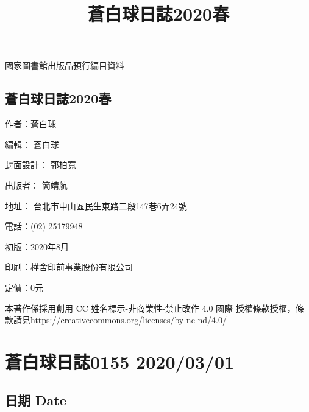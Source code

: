 \documentclass[a5paper, 12pt
]{book}
\title{蒼白球日誌2020春}
\date{}
\begin{document}
\clearpage\maketitle
\thispagestyle{empty}
\subsection{}
\begin{flushleft}
國家圖書館出版品預行編目資料 \linebreak
\end{flushleft}
\subsection{蒼白球日誌2020春}
\begin{flushleft}
作者：蒼白球

編輯： 蒼白球

封面設計： 郭柏寬

出版者： 簡靖航

地址： 台北市中山區民生東路二段147巷6弄24號

電話：(02) 25179948

初版：2020年8月

印刷：樺舍印前事業股份有限公司

定價：0元

本著作係採用創用 CC 姓名標示-非商業性-禁止改作 4.0 國際 授權條款授權，條款請見\linebreak https://creativecommons.org/licenses/by-nc-nd/4.0/
\end{flushleft}
\clearpage
\tableofcontents

\hypertarget{ux84bcux767dux7403ux65e5ux8a8c0155-20200301}{%
\section{蒼白球日誌0155
2020/03/01}\label{ux84bcux767dux7403ux65e5ux8a8c0155-20200301}}

\hypertarget{ux65e5ux671f-date}{%
\subsection{日期 Date}\label{ux65e5ux671f-date}}
\end{document}

